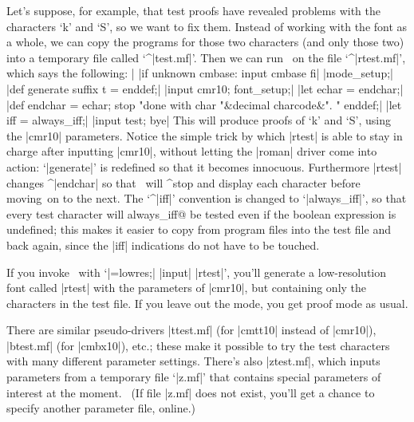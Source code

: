 Let's suppose, for example, that test proofs have revealed problems
with the characters `k' and `S', so we want to fix them. Instead of
working with the font as a whole, we can copy the programs for those two
characters (and only those two) into a temporary file called `^|test.mf|'.
Then we can run \MF\ on the file `^|rtest.mf|', which says the following:
\beginlines
|%
|if unknown cmbase: input cmbase fi|
|mode_setup;|
\smallskip
|def generate suffix t = enddef;|
|input cmr10; font_setup;|
\smallbreak
|let echar = endchar;|
|def endchar = echar; stop "done with char "&decimal charcode&". " enddef;|
|let iff = always_iff;|
\smallskip
|input test; bye|
\endlines
This will produce proofs of `k' and `S', using the |cmr10| parameters.
Notice the simple trick by which |rtest| is able to stay in charge
after inputting |cmr10|, without letting the |roman| driver come into
action: `|generate|' is redefined so that it becomes innocuous.
Furthermore |rtest| changes ^|endchar| so that \MF\ will ^{stop} and
display each character before moving~on to the next. The `^|iff|'
convention is changed to `|always_iff|', so that every test character will
^^@always\_iff@ be tested even if the boolean expression is undefined;
this makes it easier to copy from program files
into the test file and back again, since the |iff| indications do not
have to be touched.

If you invoke \MF\ with `|\mode=lowres;| |input| |rtest|', you'll generate
a low-resolution font called |rtest| with the parameters of |cmr10|,
but containing only the characters in the test file. If you leave out
the mode, you get proof mode as usual.

There are similar pseudo-drivers |ttest.mf| (for |cmtt10| instead of |cmr10|),
|btest.mf| (for |cmbx10|), etc.; these make it possible to try the
test characters with many different parameter settings. There's also
|ztest.mf|, which inputs parameters from a temporary file `|z.mf|' that
contains special parameters of interest at the moment. \ (If file
|z.mf| does not exist, you'll get a chance to specify another
parameter file, online.) 

